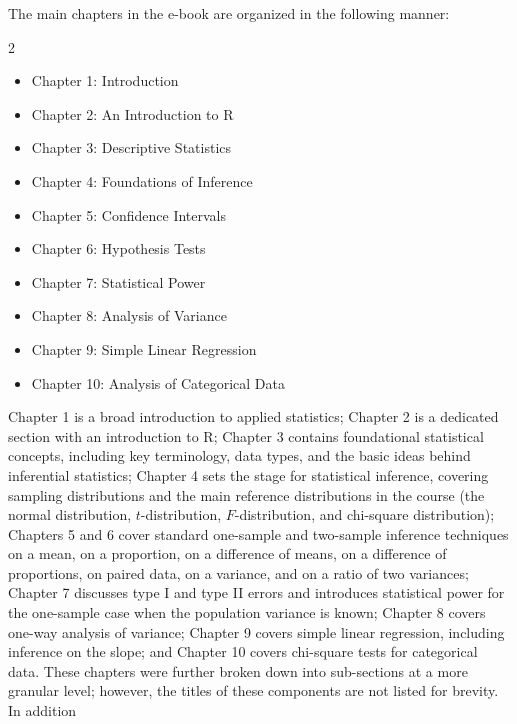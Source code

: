 \documentclass[11pt]{article}
\begin{document}
The main chapters in the e-book are organized in the following manner:
\setlength{\columnsep}{-100pt}
\begin{multicols}{2}
\setlength{\columnsep}{30pt}
\begin{itemize}[itemsep=-2.0pt, topsep=-5pt]
\item	Chapter 1: Introduction
\item	Chapter 2: An Introduction to R
\item	Chapter 3: Descriptive Statistics
\item	Chapter 4: Foundations of Inference
\item	Chapter 5: Confidence Intervals
\item	Chapter 6: Hypothesis Tests
\item	Chapter 7: Statistical Power
\item	Chapter 8: Analysis of Variance
\item	Chapter 9: Simple Linear Regression
\item	Chapter 10: Analysis of Categorical Data
\end{itemize}
\end{multicols}

Chapter 1 is a broad introduction to applied statistics;
Chapter 2 is a dedicated section with an introduction to R;
Chapter 3 contains foundational statistical concepts, including key terminology, data types, and the basic ideas behind inferential statistics;
Chapter 4 sets the stage for statistical inference, covering sampling distributions and the main reference distributions in the course (the normal distribution, $t$-distribution, $F$-distribution, and chi-square distribution);
Chapters 5 and 6 cover standard one-sample and two-sample inference techniques on a mean, on a proportion, on a difference of means, on a difference of proportions, on paired data, on a variance, and on a ratio of two variances;
Chapter 7 discusses type I and type II errors and introduces statistical power for the one-sample case when the population variance is known;
Chapter 8 covers one-way analysis of variance;
Chapter 9 covers simple linear regression, including inference on the slope; and
Chapter 10 covers chi-square tests for categorical data.
These chapters were further broken down into sub-sections at a more granular level; however, the titles of these components are not listed for brevity.
In addition
\end{document}

